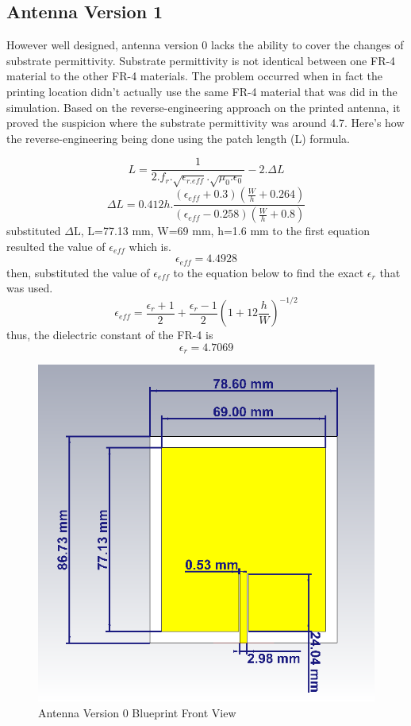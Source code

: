 \documentclass[conference]{IEEEtran}
\begin{document}
\subsection{Antenna Version 1}

However well designed, antenna version 0 lacks the ability to cover the changes of substrate permittivity. Substrate permittivity is not identical between one FR-4 material to the other FR-4 materials. The problem occurred when in fact the printing location didn't actually use the same FR-4 material that was did in the simulation. Based on the reverse-engineering approach on the printed antenna, it proved the suspicion where the substrate permittivity was around 4.7. Here's how the reverse-engineering being done using the patch length (L) formula.

\[L = \frac{1}{2.f_{r}.\sqrt{\epsilon_{r.eff}}.\sqrt{\mu_{0}.\epsilon_{0}}  }- 2.\Delta L\]
\[\Delta L = 0.412h.\frac{(\epsilon_{eff}+0.3)(\frac{W}{h}+0.264)}{(\epsilon_{eff}-0.258)(\frac{W}{h}+0.8)}\]
substituted $\Delta$L, L=77.13 mm, W=69 mm, h=1.6 mm to the first equation resulted the value of $\epsilon_{eff}$ which is.
\[\epsilon_{eff} = 4.4928 \]
then, substituted the value of $\epsilon_{eff}$ to the equation below to find the exact $\epsilon_{r}$ that was used.
\[\epsilon_{eff} = \frac{\epsilon_{r}+1}{2}+\frac{\epsilon_{r}-1}{2}(1+12\frac{h}{W})^{-1/2}\]
thus, the dielectric constant of the FR-4 is
\[\epsilon_{r}=4.7069\]

\begin{figure}[htbp]
  \centering
  \includegraphics[width=0.9\columnwidth]{figures/front_view_0}
  \caption{Antenna Version 0 Blueprint Front View}
  \label{fig:fig1}
\end{figure}
\end{document}
